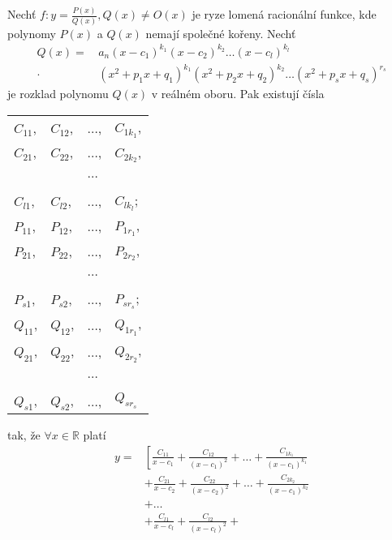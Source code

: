 \begin{veta}
    Nechť $f: y=\frac{P(x)}{Q(x)}, Q(x) \ne O(x)$ je ryze lomená
    racionální funkce, kde polynomy $P(x)$ a $Q(x)$ nemají společné
    kořeny. Nechť
    \begin{align*}
        Q(x) = & \, a_n(x-c_1)^{k_1}(x-c_2)^{k_2} \dots
        (x-c_l)^{k_l} \\
        \cdot & \, (x^2+p_1x + q_1)^{k_1}(x^2+p_2x+q_2)
        ^{k_2} \dots (x^2+p_sx+q_s)^{r_s}
    \end{align*}
    je rozklad polynomu $Q(x)$ v reálném oboru. Pak existují čísla
    \begin{center}
        \begin{tabular}{l l l l}
            $C_{11}$, & $C_{12}$, & $\dots$, & $C_{1k_1}$, \\
            $C_{21}$, & $C_{22}$, & $\dots$, & $C_{2k_2}$, \\
            \,        & \,        & $\dots$  & \,          \\
            $C_{l1}$, & $C_{l2}$, & $\dots$, & $C_{lk_l}$; \\
            $P_{11}$, & $P_{12}$, & $\dots$, & $P_{1r_1}$, \\
            $P_{21}$, & $P_{22}$, & $\dots$, & $P_{2r_2}$, \\
            \,        & \,        & $\dots$  & \,          \\
            $P_{s1}$, & $P_{s2}$, & $\dots$, & $P_{sr_s}$; \\
            $Q_{11}$, & $Q_{12}$, & $\dots$, & $Q_{1r_1}$, \\
            $Q_{21}$, & $Q_{22}$, & $\dots$, & $Q_{2r_2}$, \\
            \,        & \,        & $\dots$  & \,          \\
            $Q_{s1}$, & $Q_{s2}$, & $\dots$, & $Q_{sr_s}$
        \end{tabular}
    \end{center}
    tak, že $\forall x \in \mathbb R$ platí
    \begin{align*}
        y = & \left [
              \frac{C_{11}}{x-c_1} + \frac{C_{12}}{(x-c_1)^2} +
              \dots + \frac{C_{1k_1}}{(x-c_1)^{k_1}} \right . \\
          & + \frac{C_{21}}{x-c_2} + \frac{C_{22}}{(x-c_2)^2} +
              \dots + \frac{C_{2k_2}}{(x-c_1)^{k_2}} \\
          & + \dots \\
          & + \frac{C_{l1}}{x-c_l} + \frac{C_{l2}}{(x-c_l)^2} +

\end{align*}
\end{veta}

